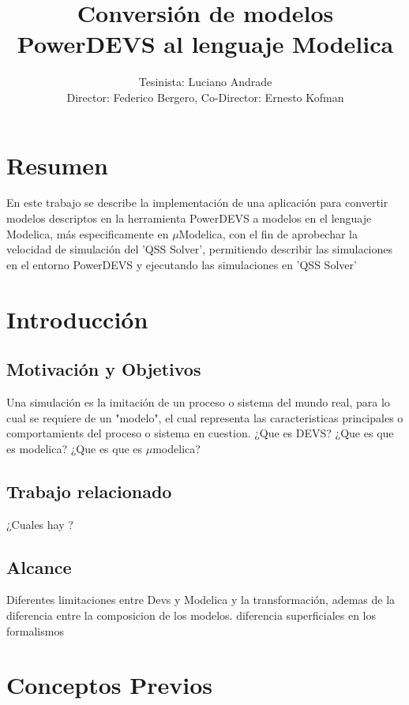 \documentclass[a4paper,	11pt]{article}
\begin{document}
\renewcommand\floatpagefraction{.9}
\renewcommand\topfraction{.9}
\renewcommand\bottomfraction{.9}
\renewcommand\textfraction{.1}
\setcounter{totalnumber}{50}
\setcounter{topnumber}{50}
\setcounter{bottomnumber}{50}

\title{Conversión de modelos PowerDEVS al lenguaje Modelica}
\author{Tesinista: Luciano Andrade \\ Director: Federico Bergero, Co-Director: Ernesto Kofman} 

\maketitle
\section{Resumen}
En este trabajo se describe la implementación de una aplicación para convertir modelos descriptos en la herramienta PowerDEVS a modelos en el lenguaje Modelica, más especificamente en $\mu$Modelica, con el fin de aprobechar la velocidad de simulación del 'QSS Solver', permitiendo describir las simulaciones en el entorno PowerDEVS y ejecutando las simulaciones en 'QSS Solver'


\section{Introducción}
\subsection{Motivación y Objetivos}
Una simulación es la imitación de un proceso o sistema del mundo real, para lo cual se requiere de un "modelo", el cual representa las caracteristicas principales o comportamients del proceso o sistema en cuestion.
¿Que es DEVS?
¿Que es que es modelica?
¿Que es que es $\mu$modelica?

\subsection{Trabajo relacionado}
¿Cuales hay ?
\subsection{Alcance}
 Diferentes limitaciones entre Devs y Modelica y la transformación, ademas de la diferencia entre la composicion de los modelos.
 diferencia superficiales en los formalismos

\section{Conceptos Previos}
\end{document}
